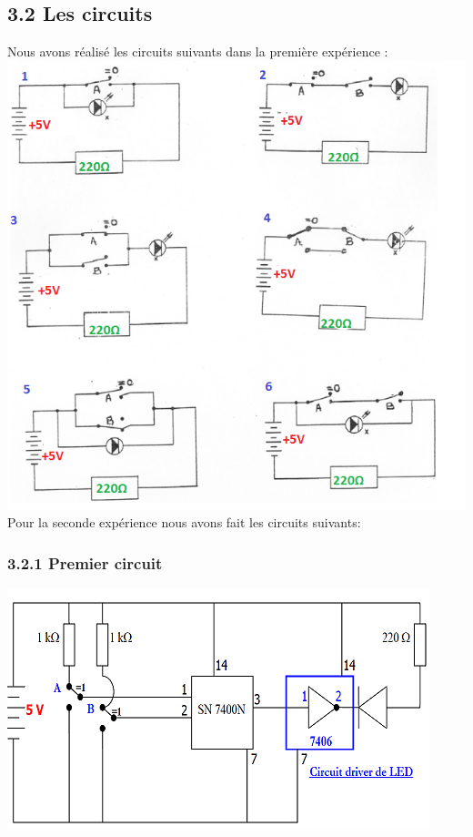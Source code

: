 \documentclass{report}
\begin{document}
\newpage

\subsection*{3.2 Les circuits}
Nous avons réalisé les circuits suivants dans la premi\`ere exp\'erience :\\
\includegraphics[scale=0.7]{Circuits_1.png} 
\\
\newpage
Pour la seconde exp\'erience nous avons fait les circuits suivants: \\
\subsubsection*{3.2.1 Premier circuit}
\includegraphics[scale=1]{CirInt1.png} 
\end{document}
